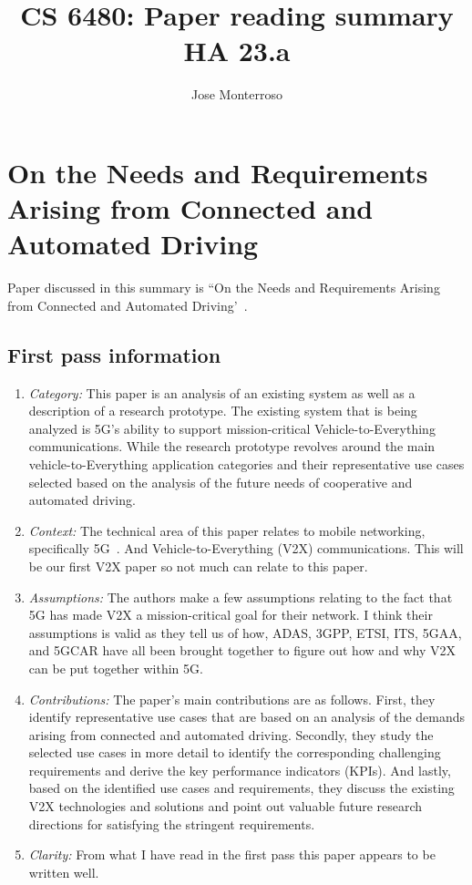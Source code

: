 \documentclass[letterpaper,twocolumn,10pt]{article}
\title{CS 6480: Paper reading summary\\
HA 23.a\\}
\author{Jose Monterroso}
\affil{School of Computing, University of Utah}
\begin{document}
\maketitle
\section{On the Needs and Requirements Arising from Connected and Automated Driving}

Paper discussed in this summary is ``On the Needs and Requirements Arising from Connected and Automated Driving'~\cite{ontheneeds}.

\subsection{First pass information}
\label{sec:first}
\begin{enumerate}

\item {\it Category:} 
This paper is an analysis of an existing system as well as a description of a research prototype. The existing system
that is being analyzed is 5G's ability to support mission-critical Vehicle-to-Everything communications. While the research
prototype revolves around the main vehicle-to-Everything application categories and their representative use cases selected
based on the analysis of the future needs of cooperative and automated driving. 

\item {\it Context:} 
The technical area of this paper relates to mobile networking, specifically 5G~\cite{5gwhite}. And Vehicle-to-Everything (V2X)
communications. This will be our first V2X paper so not much can relate to this paper.

\item {\it Assumptions:}  
The authors make a few assumptions relating to the fact that 5G has made V2X a mission-critical goal for their network.
I think their assumptions is valid as they tell us of how, ADAS, 3GPP, ETSI, ITS, 5GAA, and 5GCAR have all been brought
together to figure out how and why V2X can be put together within 5G.

\item {\it Contributions:} 
The paper's main contributions are as follows. First, they identify representative use cases that are based on an 
analysis of the demands arising from connected and automated driving. Secondly, they study the selected use cases in 
more detail to identify the corresponding challenging requirements and derive the key performance indicators (KPIs). And 
lastly, based on the identified use cases and requirements, they discuss the existing V2X technologies and solutions and
point out valuable future research directions for satisfying the stringent requirements. 

\item {\it Clarity:}
From what I have read in the first pass this paper appears to be written well.

\end{enumerate}
\end{document}

